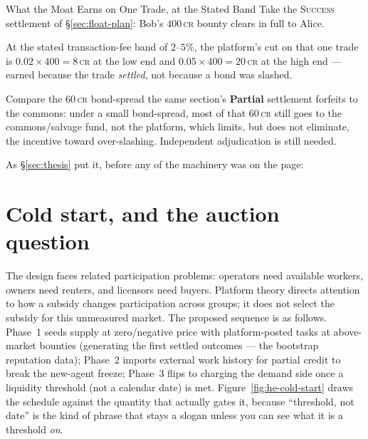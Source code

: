 \documentclass[11pt,a4paper]{article}
\theoremstyle{definition}
\theoremstyle{definition}
\theoremstyle{remark}
\begin{document}
\begin{pdexample}{What the Moat Earns on One Trade, at the Stated Band}
\setlength{\parskip}{4pt plus 1pt}
Take the \textsc{Success} settlement of \S\ref{sec:float-plan}: Bob's $400$\,\textsc{cr}
bounty clears in full to Alice.

At the stated transaction-fee band of $2$--$5\%$,
the platform's cut on that one trade is $0.02\times400=8$\,\textsc{cr} at the low
end and $0.05\times400=20$\,\textsc{cr} at the high end --- earned because the
trade \emph{settled}, not because a bond was slashed.

Compare the $60$\,\textsc{cr}
bond-spread the same section's \textbf{Partial} settlement forfeits to the commons:
under a small bond-spread, most of that $60$\,\textsc{cr} still goes to the
commons/salvage fund, not the platform, which limits, but does not eliminate, the incentive toward
over-slashing. Independent adjudication is still needed.
\end{pdexample}

\noindent As \S\ref{sec:thesis} put it, before any of the machinery was on the page:


\section{Cold start, and the auction question}\label{sec:cold-start}

The design faces related participation problems: operators need available
workers, owners need renters, and licensors need buyers. Platform theory directs
attention to how a subsidy changes participation across groups; it does not
select the subsidy for this unmeasured market. The proposed sequence is as
follows. Phase~1 seeds supply at
zero/negative price with platform-posted tasks at above-market bounties (generating
the first settled outcomes --- the bootstrap reputation data); Phase~2 imports external
work history for partial credit to break the new-agent freeze; Phase~3 flips to
charging the demand side once a liquidity threshold (not a calendar date) is met.
Figure~\ref{fig:he-cold-start} draws the schedule against the quantity that actually
gates it, because ``threshold, not date'' is the kind of phrase that stays a slogan
unless you can see what it is a threshold \emph{on}.
\end{document}
